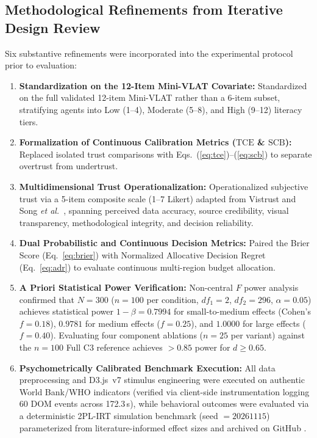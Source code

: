 \documentclass[conference]{IEEEtran}
\newcommand{\TCE}{\mathrm{TCE}}
\newcommand{\SCB}{\mathrm{SCB}}
\begin{document}
\subsection{Methodological Refinements from Iterative Design Review}
Six substantive refinements were incorporated into the experimental protocol prior to evaluation:
\begin{enumerate}
\item \textbf{Standardization on the 12-Item Mini-VLAT Covariate:} Standardized on the full validated 12-item Mini-VLAT \cite{pandey2023} rather than a 6-item subset, stratifying agents into Low (1--4), Moderate (5--8), and High (9--12) literacy tiers.
\item \textbf{Formalization of Continuous Calibration Metrics ($\TCE$ \& $\SCB$):} Replaced isolated trust comparisons with Eqs.~(\ref{eq:tce})--(\ref{eq:scb}) to separate overtrust from undertrust.
\item \textbf{Multidimensional Trust Operationalization:} Operationalized subjective trust via a 5-item composite scale (1--7 Likert) adapted from Vistrust \cite{elhamdadi2024} and Song \textit{et al.}\ \cite{song2026}, spanning perceived data accuracy, source credibility, visual transparency, methodological integrity, and decision reliability.
\item \textbf{Dual Probabilistic and Continuous Decision Metrics:} Paired the Brier Score (Eq.~\ref{eq:brier}) with Normalized Allocative Decision Regret (Eq.~\ref{eq:adr}) to evaluate continuous multi-region budget allocation.
\item \textbf{A Priori Statistical Power Verification:} Non-central $F$ power analysis confirmed that $N = 300$ ($n = 100$ per condition, $df_1 = 2$, $df_2 = 296$, $\alpha = 0.05$) achieves statistical power $1 - \beta = 0.7994$ for small-to-medium effects (Cohen's $f = 0.18$), $0.9781$ for medium effects ($f = 0.25$), and $1.0000$ for large effects ($f = 0.40$). Evaluating four component ablations ($n = 25$ per variant) against the $n = 100$ Full C3 reference achieves $> 0.85$ power for $d \geq 0.65$.
\item \textbf{Psychometrically Calibrated Benchmark Execution:} All data preprocessing and D3.js~v7 stimulus engineering were executed on authentic World Bank/WHO indicators (verified via client-side instrumentation logging 60 DOM events across 172.3\,s), while behavioral outcomes were evaluated via a deterministic 2PL-IRT simulation benchmark (seed $= 20261115$) parameterized from literature-informed effect sizes and archived on GitHub \cite{repo}.
\end{enumerate}
\end{document}
